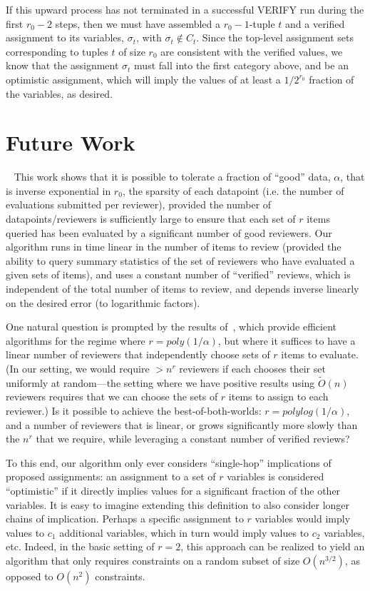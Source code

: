 \documentclass[final,12pt]{colt2018}
\begin{document}
If this upward process has not terminated in a successful VERIFY run during the first $r_0-2$ steps, then we must have assembled a $r_0-1$-tuple $t$ and a verified assignment to its variables, $\sigma_t$, with $\sigma_t \not \in C_t$.  Since the top-level assignment sets corresponding to tuples $t$ of size $r_0$ are consistent with the verified values, we know that the assignment $\sigma_t$ must fall into the first category above, and be an optimistic assignment, which will imply the values of at least a $1/2^{r_0}$ fraction of the variables, as desired.


\fi




\section{Future Work}~\label{sec:futureWork}
This work shows that it is possible to tolerate a fraction of ``good'' data, $\alpha$, that is inverse exponential in $r_0$, the sparsity of each datapoint (i.e. the number of evaluations submitted per reviewer), provided the number of datapoints/reviewers is sufficiently large to ensure that each set of $r$ items queried has been evaluated by a significant number of good reviewers.  Our algorithm runs in time linear in the number of items to review (provided the ability to query summary statistics of the set of reviewers who have evaluated a given sets of items), and uses a constant number of ``verified'' reviews, which is independent of the total number of items to review, and depends inverse linearly on the desired error (to logarithmic factors).

One natural question is prompted by the results of~\citep{steinhardt2016avoiding}, which provide efficient algorithms for the regime where $r= poly(1/\alpha)$, but where it suffices to have a linear number of reviewers that independently choose sets of $r$ items to evaluate.  (In our setting, we would require $>n^r$ reviewers if each chooses their set uniformly at random---the setting where we have positive results using $\tilde{O}(n)$ reviewers requires that we can choose the sets of $r$ items to assign to each reviewer.)  Is it possible to achieve the best-of-both-worlds: $r=polylog(1/\alpha)$, and a number of reviewers that is linear, or grows significantly more slowly than the $n^r$ that we require, while leveraging a constant number of verified reviews?

To this end, our algorithm only ever considers ``single-hop'' implications of proposed assignments: an assignment to a set of $r$ variables is considered ``optimistic'' if it directly implies values for a significant fraction of the other variables.  It is easy to imagine extending this definition to also consider longer chains of implication.  Perhaps a specific assignment to $r$ variables would imply values to $c_1$ additional variables, which in turn would imply values to $c_2$ variables, etc.   Indeed, in the basic setting of $r=2$, this approach can be realized to yield an algorithm that only requires constraints on a random subset of size $O(n^{3/2})$, as opposed to $O(n^2)$ constraints.
\end{document}
